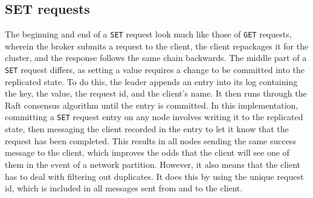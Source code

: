 \documentclass[psamsfonts]{amsart}
\begin{document}
\subsection{SET requests}
The beginning and end of a \verb|SET| request look much like those of \verb|GET| requests, wherein the broker submits a request to the client, the client repackages it for the cluster, and the response follows the same chain backwards. The middle part of a \verb|SET| request differs, as setting a value requires a change to be committed into the replicated state. To do this, the leader appends an entry into its log containing the key, the value, the request id, and the client's name. It then runs through the Raft consensus algorithm until the entry is committed. In this implementation, committing a \verb|SET| request entry on any node involves writing it to the replicated state, then messaging the client recorded in the entry to let it know that the request has been completed. This results in all nodes sending the same success message to the client, which improves the odds that the client will see one of them in the event of a network partition. However, it also means that the client has to deal with filtering out duplicates. It does this by using the unique request id, which is included in all messages sent from and to the client.
\end{document}
